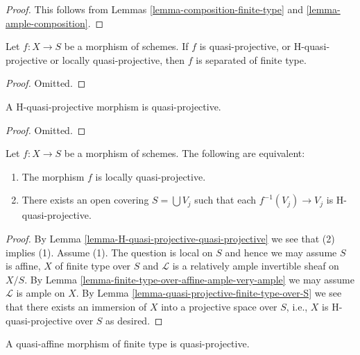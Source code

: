 \begin{proof}
This follows from
Lemmas \ref{lemma-composition-finite-type} and
\ref{lemma-ample-composition}.
\end{proof}

\begin{lemma}
\label{lemma-quasi-projective-properties}
Let $f : X \to S$ be a morphism of schemes. If $f$ is quasi-projective,
or H-quasi-projective or locally quasi-projective, then $f$ is
separated of finite type.
\end{lemma}

\begin{proof}
Omitted.
\end{proof}

\begin{lemma}
\label{lemma-H-quasi-projective-quasi-projective}
A H-quasi-projective morphism is quasi-projective.
\end{lemma}

\begin{proof}
Omitted.
\end{proof}

\begin{lemma}
\label{lemma-characterize-locally-quasi-projective}
Let $f : X \to S$ be a morphism of schemes.
The following are equivalent:
\begin{enumerate}
\item The morphism $f$ is locally quasi-projective.
\item There exists an open covering $S = \bigcup V_j$ such
that each $f^{-1}(V_j) \to V_j$ is H-quasi-projective.
\end{enumerate}
\end{lemma}

\begin{proof}
By Lemma \ref{lemma-H-quasi-projective-quasi-projective}
we see that (2) implies (1). Assume (1).
The question is local on $S$ and hence we may assume $S$ is affine,
$X$ of finite type over $S$ and
$\mathcal{L}$ is a relatively ample invertible sheaf on $X/S$.
By Lemma \ref{lemma-finite-type-over-affine-ample-very-ample}
we may assume $\mathcal{L}$ is ample on $X$.
By Lemma \ref{lemma-quasi-projective-finite-type-over-S} we see that there
exists an immersion of $X$ into
a projective space over $S$, i.e., $X$ is H-quasi-projective over $S$
as desired.
\end{proof}

\begin{lemma}
\label{lemma-quasi-affine-finite-type-quasi-projective}
\begin{reference}
\cite[II, Proposition 5.3.4 (i)]{EGA}
\end{reference}
A quasi-affine morphism of finite type is quasi-projective.
\end{lemma}

